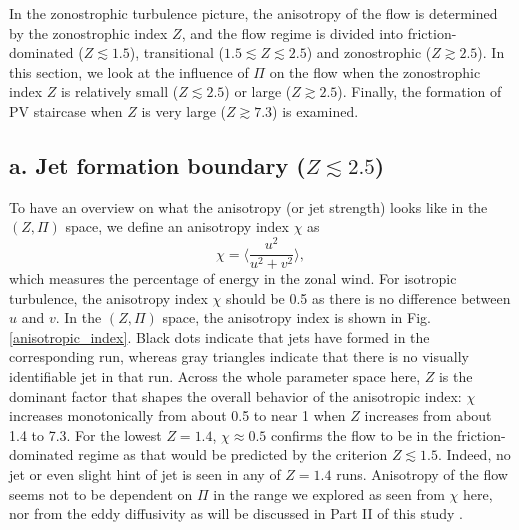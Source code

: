 \documentclass{ametsoc}
\begin{document}
In the zonostrophic turbulence picture, the anisotropy of the flow is
determined by the zonostrophic index $Z$, and the flow regime is
divided into friction-dominated ($Z\apprle1.5$), transitional ($1.5\apprle Z\apprle2.5$)
and zonostrophic ($Z\apprge2.5$). In this section, we look at the
influence of $\Pi$ on the flow when the zonostrophic index $Z$ is
relatively small ($Z\apprle2.5$) or large ($Z\apprge2.5$). Finally,
the formation of PV staircase when $Z$ is very large ($Z\apprge7.3$)
is examined.

\subsection*{a. Jet formation boundary ($Z\apprle2.5$)}

To have an overview on what the anisotropy (or jet strength) looks
like in the $(Z,\Pi)$ space, we define an anisotropy index $\chi$ as
\begin{equation}
\chi=\langle\frac{u^{2}}{u^{2}+v^{2}}\rangle,
\end{equation}
which measures the percentage of energy in the zonal wind. For
isotropic turbulence, the anisotropy index $\chi$ should be 0.5
as there is no difference between $u$ and $v$. In the $(Z,\Pi)$
space, the anisotropy index is shown in Fig. \ref{anisotropic_index}.
Black dots indicate that jets have formed in the corresponding run,
whereas gray triangles indicate that there is no visually identifiable
jet in that run. Across the whole parameter space here, $Z$ is the
dominant factor that shapes the overall behavior of the anisotropic
index: $\chi$ increases monotonically from about 0.5 to near 1 when
$Z$ increases from about 1.4 to 7.3. For the lowest $Z=1.4$, $\chi\approx0.5$
confirms the flow to be in the friction-dominated regime as that would
be predicted by the criterion $Z\apprle1.5$. Indeed, no jet or even
slight hint of jet is seen in any of $Z=1.4$ runs. Anisotropy of the flow 
seems not to be dependent on $\Pi$ in the range we 
explored as seen from $\chi$ here, nor from the eddy 
diffusivity as will be discussed in Part II of this study \citep{Chai2019b}.
\end{document}
